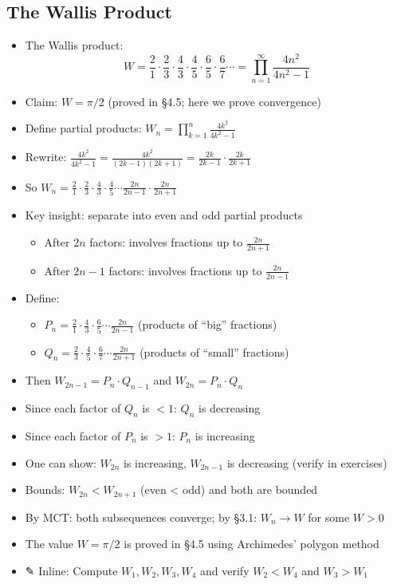 \documentclass[
  10pt,
  letterpaper,
]{scrbook}
\providecommand{\tightlist}{%
  \setlength{\itemsep}{0pt}\setlength{\parskip}{0pt}}
\begin{document}
\subsection{The Wallis Product}\label{the-wallis-product}

\begin{itemize}
\tightlist
\item
  The Wallis product:
  \[W = \frac{2}{1} \cdot \frac{2}{3} \cdot \frac{4}{3} \cdot \frac{4}{5} \cdot \frac{6}{5} \cdot \frac{6}{7} \cdots = \prod_{n=1}^{\infty} \frac{4n^2}{4n^2 - 1}\]
\item
  Claim: \(W = \pi/2\) (proved in §4.5; here we prove convergence)
\item
  Define partial products:
  \(W_n = \prod_{k=1}^{n} \frac{4k^2}{4k^2 - 1}\)
\item
  Rewrite:
  \(\frac{4k^2}{4k^2 - 1} = \frac{4k^2}{(2k-1)(2k+1)} = \frac{2k}{2k-1} \cdot \frac{2k}{2k+1}\)
\item
  So
  \(W_n = \frac{2}{1} \cdot \frac{2}{3} \cdot \frac{4}{3} \cdot \frac{4}{5} \cdots \frac{2n}{2n-1} \cdot \frac{2n}{2n+1}\)
\item
  Key insight: separate into even and odd partial products

  \begin{itemize}
  \tightlist
  \item
    After \(2n\) factors: involves fractions up to \(\frac{2n}{2n+1}\)
  \item
    After \(2n-1\) factors: involves fractions up to \(\frac{2n}{2n-1}\)
  \end{itemize}
\item
  Define:

  \begin{itemize}
  \tightlist
  \item
    \(P_n = \frac{2}{1} \cdot \frac{4}{3} \cdot \frac{6}{5} \cdots \frac{2n}{2n-1}\)
    (products of ``big'' fractions)
  \item
    \(Q_n = \frac{2}{3} \cdot \frac{4}{5} \cdot \frac{6}{7} \cdots \frac{2n}{2n+1}\)
    (products of ``small'' fractions)
  \end{itemize}
\item
  Then \(W_{2n-1} = P_n \cdot Q_{n-1}\) and \(W_{2n} = P_n \cdot Q_n\)
\item
  Since each factor of \(Q_n\) is \(< 1\): \(Q_n\) is decreasing
\item
  Since each factor of \(P_n\) is \(> 1\): \(P_n\) is increasing
\item
  One can show: \(W_{2n}\) is increasing, \(W_{2n-1}\) is decreasing
  (verify in exercises)
\item
  Bounds: \(W_{2n} < W_{2n+1}\) (even \textless{} odd) and both are
  bounded
\item
  By MCT: both subsequences converge; by §3.1: \(W_n \to W\) for some
  \(W > 0\)
\item
  The value \(W = \pi/2\) is proved in §4.5 using Archimedes' polygon
  method
\item
  ✎ Inline: Compute \(W_1, W_2, W_3, W_4\) and verify \(W_2 < W_4\) and
  \(W_3 > W_1\)
\end{itemize}
\end{document}
